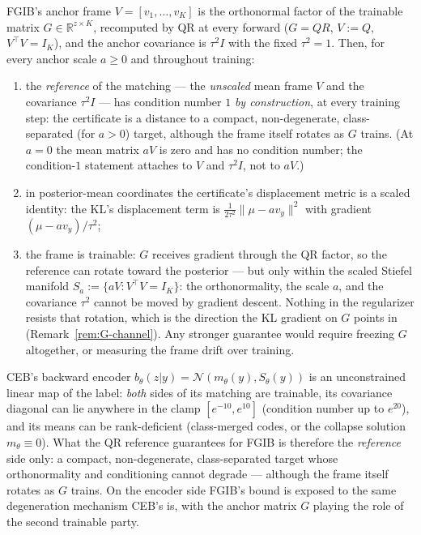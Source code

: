 \begin{proposition}\label{prop:conditioning}
FGIB's anchor frame $V = [v_1, \dots, v_K]$ is the orthonormal factor of the trainable
matrix $G \in \mathbb{R}^{z \times K}$, recomputed by QR at every forward
($G = QR$, $V := Q$, $V^{\top}V = I_K$), and the anchor covariance is
$\tau^2 I$ with the fixed $\tau^2=1$.
Then, for every anchor scale $a \ge 0$ and throughout training:
\begin{enumerate}
\item[(i)] the \emph{reference} of the matching --- the \emph{unscaled} mean frame $V$
and the covariance $\tau^2 I$ --- has condition number $1$ \emph{by construction}, at
every training step: the certificate is a distance to a compact, non-degenerate,
class-separated (for $a > 0$) target, although the frame itself rotates as $G$ trains.
(At $a = 0$ the mean matrix $a V$ is zero and has no condition number; the
condition-$1$ statement attaches to $V$ and $\tau^2 I$, not to $a V$.)
\item[(ii)] in posterior-mean coordinates the certificate's displacement metric is a
scaled identity: the KL's displacement term is $\tfrac{1}{2\tau^2}\|\mu - a v_y\|^2$
with gradient $(\mu - a v_y)/\tau^2$;
\item[(iii)] the frame is trainable: $G$ receives gradient through the QR factor, so
the reference can rotate toward the posterior --- but only within the scaled Stiefel
manifold $S_a := \{aV : V^{\top}V = I_K\}$: the orthonormality, the scale $a$, and the
covariance $\tau^2$ cannot be moved by gradient descent. Nothing in the regularizer
resists that rotation, which is the direction the KL gradient on $G$ points in
(Remark~\ref{rem:G-channel}). Any stronger guarantee would require freezing $G$
altogether, or measuring the frame drift over training.
\end{enumerate}
CEB's backward encoder $b_\theta(z|y) = \mathcal{N}(m_\theta(y), S_\theta(y))$ is an
unconstrained linear map of the label: \emph{both} sides of its matching are trainable,
its covariance diagonal can lie anywhere in the clamp $[e^{-10}, e^{10}]$ (condition
number up to $e^{20}$), and its means can be rank-deficient (class-merged codes, or the
collapse solution $m_\theta \equiv 0$). What the QR reference guarantees for FGIB is
therefore the \emph{reference} side only: a compact, non-degenerate, class-separated
target whose orthonormality and conditioning cannot degrade --- although the frame
itself rotates as $G$ trains. On the encoder side FGIB's bound is exposed to the same
degeneration mechanism CEB's is, with the anchor matrix $G$ playing the role of the
second trainable party.
\end{proposition}

